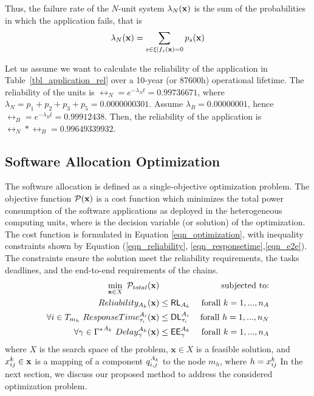 Thus, the failure rate of the $N$-unit system $\lambda_N(\textbf{x})$ is the sum of the probabilities in which the application fails, that is
\[
\lambda_N(\textbf{x})=\sum_{s\in \xi|f_s(\textbf{x})=0}p_s(\textbf{x})
\]
\begin{example}
	Let us assume we want to calculate the reliability of the application in Table~\ref{tbl_application_rel} over a 10-year (or 87600h) operational lifetime. The reliability of the units is $\rel_N=e^{-\lambda_N t}=0.99736671$, where $\lambda_N=p_1+p_2+p_3+p_5=0.0000000301$. Assume $\lambda_B=0.00000001$, hence $\rel_B=e^{-\lambda_B t}=0.99912438$. Then, the reliability of the application is $\rel_N*\rel_B=0.99649339932$.
\end{example}
\subsection{Software Allocation Optimization}\label{sec_allocation}
The software allocation is defined as a single-objective optimization problem. The objective function  $\mathcal{P}(\textbf{x})$ is a cost function which minimizes the total power consumption of the software applications as deployed in the heterogeneous computing units, where \ttx is the decision variable (or solution) of the optimization. The cost function is formulated in Equation \ref{eqn_optimization}, with inequality constraints shown by Equation (\ref{eqn_reliability}, \ref{eqn_responsetime},\ref{eqn_e2e}). The constraints ensure the solution meet the reliability requirements, the tasks deadlines,  and the end-to-end requirements of the chains. 
\begin{align}
\label{eqn_optimization}
\min_{\x\in X}\ \mathcal{P}_{total}(\x) & &\text{ subjected to:} \\
\label{eqn_reliability}
\rel_{A_k}(\x)&\leq \RL_{A_k} & \mbox{ forall } k=1,...,n_{A}\\
\label{eqn_responsetime}
\forall i\in T_{m_h}\    \sss{ResponseTime}[i][{\tau_i}](\x)&\leq \sss{\DL}[i][\tau_i]& \mbox{forall } h=1,...,n_{N}\\ 
\label{eqn_e2e}
\forall \gamma \in \ssp{{\Gamma^*}}\  \sss{Delay}[k][\gamma](\x)&\leq \sss{\EE}[k][\gamma]& \mbox{forall } k=1,...,n_{A}
\end{align}
where $X$ is the search space of the problem, $\textbf{x}\in X$ is a feasible solution, and $x^{k}_{ij}\in \textbf{x}$ is a mapping of a component $\sss{q}[k][i,j]$ to the node $m_h$, where $h=x^{k}_{ij}$
In the next section, we discuss our proposed method to address the considered optimization problem. 
